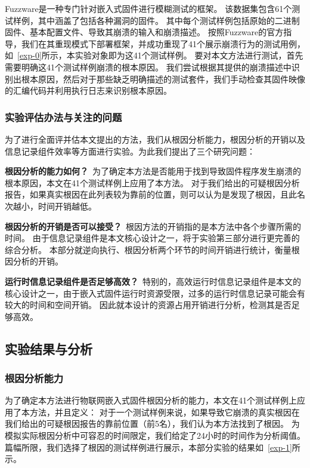 Fuzzware是一种专门针对嵌入式固件进行模糊测试的框架。
该数据集包含61个测试样例，其中涵盖了包括各种漏洞的固件。
其中每个测试样例包括原始的二进制固件、基本配置文件、导致其崩溃的输入和崩溃描述。
按照Fuzzware的官方指导，我们在其重现模式下部署框架，并成功重现了41个展示崩溃行为的测试用例，如~\autoref{exp-0}所示，本实验对象即为这41个测试样例。
要对本文方法进行测试，首先需要明确这41个测试样例崩溃的根本原因。
我们尝试根据其提供的崩溃描述中识别出根本原因，然后对于那些缺乏明确描述的测试套件，我们手动检查其固件映像的汇编代码并利用执行日志来识别根本原因。
\subsubsection{实验评估办法与关注的问题}
为了进行全面评并估本文提出的方法，我们从根因分析能力，根因分析的开销以及信息记录组件效率等方面进行实验。为此我们提出了三个研究问题：

\textbf{根因分析的能力如何？}\ 
为了确定本方法是否能用于找到导致固件程序发生崩溃的根本原因，本文在41个测试样例上应用了本方法。
对于我们给出的可疑根因分析报告，如果真实根因在此列表较为靠前的位置，则可以认为是发现了根因，且此名次越小，时间开销越低。

\textbf{根因分析的开销是否可以接受？}\ 
根因方法的开销指的是本方法中各个步骤所需的时间。
由于信息记录组件是本文核心设计之一，将于实验第三部分进行更完善的综合分析。
本部分就逆向执行、根因分析两个环节的时间开销进行统计，衡量根因分析的开销。


\textbf{运行时信息记录组件是否足够高效？}\ 
特别的，高效运行时信息记录组件是本文的核心设计之一，由于嵌入式固件运行时资源受限，过多的运行时信息记录可能会有较大的时间和空间开销。
因此就本设计的资源占用开销进行分析，检测其是否足够高效。
\subsection{实验结果与分析}
\subsubsection{根因分析能力}
为了确定本方法进行物联网嵌入式固件根因分析的能力，本文在41个测试样例上应用了本方法，并且定义：
对于一个测试样例来说，如果导致它崩溃的真实根因在我们给出的可疑根因报告的靠前位置（前5名），我们认为本方法找到了根因。
为模拟实际根因分析中可容忍的时间限定，我们给定了24小时的时间作为分析阈值。
篇幅所限，我们选择了根因的测试样例进行展示，本部分实验的结果如~\autoref{exp-1}所示。

